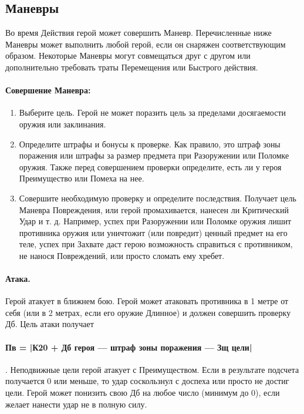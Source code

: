 \subsection{Маневры}
Во время Действия герой может совершить Маневр. Перечисленные ниже Маневры может выполнить любой герой, если он снаряжен соответствующим образом. Некоторые Маневры могут совмещаться друг с другом или дополнительно требовать траты Перемещения или Быстрого действия.
\paragraph{Совершение Маневра:}
\begin{enumerate}
\item Выберите цель. Герой не может поразить цель за пределами досягаемости оружия или заклинания.
\item Определите штрафы и бонусы к проверке. Как правило, это штраф зоны поражения или штрафы за размер предмета при Разоружении или Поломке оружия. Также перед совершением проверки определите, есть ли у героя Преимущество или Помеха на нее.
\item Совершите необходимую проверку и определите последствия. Получает цель Маневра Повреждения, или герой промахивается, нанесен ли Критический Удар и т. д. Например, успех при Разоружении или Поломке оружия лишит противника оружия или уничтожит (или повредит) ценный предмет на его теле, успех при Захвате даст герою возможность справиться с противником, не нанося Повреждений, или просто сломать ему хребет.
\end{enumerate}
\paragraph{Атака.} Герой атакует в ближнем бою. Герой может атаковать противника в 1 метре от себя (или в 2 метрах, если его оружие Длинное) и должен совершить проверку Дб. Цель атаки получает \paragraph{Пв = |К20 + Дб героя — штраф зоны поражения — Зщ цели|}. Неподвижные цели герой атакует с Преимуществом. Если в результате подсчета получается 0 или меньше, то удар соскользнул с доспеха или просто не достиг цели. Герой может понизить свою Дб на любое число (минимум до 0), если желает нанести удар не в полную силу.
